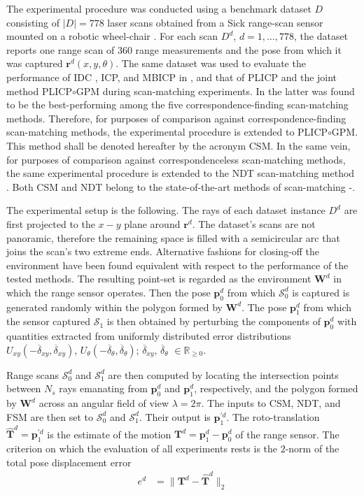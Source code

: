 The experimental procedure was conducted using a benchmark dataset $D$
consisting of $|D| = 778$ laser scans obtained from a Sick range-scan sensor
mounted on a robotic wheel-chair \cite{dataset_link}. For
each scan $D^d$, $d = 1,\dots,778$, the dataset reports one range scan of $360$
range measurements and the pose from which it was captured
$\bm{r}^d(x,y,\theta)$.  The same dataset was used to evaluate the performance
of IDC \cite{LuMilios}, ICP, and MBICP in \cite{mbicp}, and that of PLICP and
the joint method PLICP$\circ$GPM during scan-matching experiments. In
\cite{plicp} the latter was found to be the best-performing among the five
correspondence-finding scan-matching methods. Therefore, for purposes of
comparison against correspondence-finding scan-matching methods, the
experimental procedure is extended to PLICP$\circ$GPM. This method shall be
denoted hereafter by the acronym CSM. In the same vein, for purposes of
comparison against correspondenceless scan-matching methods, the same
experimental procedure is extended to the NDT scan-matching method \cite{ndt1}.
Both CSM and NDT belong to the state-of-the-art methods of scan-matching
\cite{sota_leg_1}-\cite{sota_leg_5}.

The experimental setup is the following. The rays of each dataset instance
$D^d$ are first projected to the $x-y$ plane around $\bm{r}^d$. The dataset's
scans are not panoramic, therefore the remaining space is filled with a
semicircular arc that joins the scan's two extreme ends. Alternative fashions
for closing-off the environment have been found equivalent with respect to the
performance of the tested methods. The resulting point-set is regarded as the
environment $\bm{W}^d$ in which the range sensor operates.  Then the pose
$\bm{p}_0^d$ from which $\mathcal{S}_0^d$ is captured is generated randomly
within the polygon formed by $\bm{W}^d$. The pose $\bm{p}_1^d$ from which the
sensor captured $\mathcal{S}_1$ is then obtained by perturbing the components
of $\bm{p}_0^d$ with quantities extracted from uniformly distributed error
distributions $U_{xy}(-\overline{\delta}_{xy}, \overline{\delta}_{xy})$,
$U_{\theta}(-\overline{\delta}_{\theta}, \overline{\delta}_{\theta})$;
$\overline{\delta}_{xy}$, $\overline{\delta}_\theta$ $\in \mathbb{R}_{\geq 0}$.

Range scans $\mathcal{S}_0^d$ and $\mathcal{S}_1^d$ are then computed by
locating the intersection points between $N_s$ rays emanating from $\bm{p}_0^d$
and $\bm{p}_1^d$, respectively, and the polygon formed by $\bm{W}^d$ across an
angular field of view $\lambda = 2\pi$. The inputs to CSM, NDT, and FSM are
then set to $\mathcal{S}_0^d$ and $\mathcal{S}_1^d$. Their output is
$\bm{p}_1^{\prime d}$. The roto-translation
$\hat{\bm{T}}^d = \bm{p}_1^{\prime d}$ is the estimate of the motion
$\bm{T}^d = \bm{p}_1^d - \bm{p}_0^d$ of the range sensor. The criterion on
which the evaluation of all experiments rests is the $2$-norm of the total pose
displacement error
\begin{align}
  e^d &= \| \bm{T}^d - \hat{\bm{T}}^d \|_2
  \label{eq:rototranslation_error}
\end{align}

